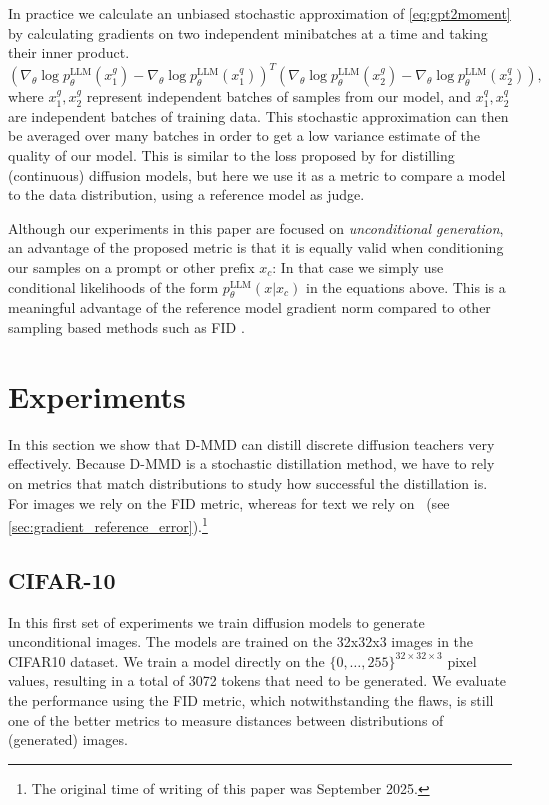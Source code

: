 In practice we calculate an unbiased stochastic approximation of \eqref{eq:gpt2moment} by calculating gradients on two independent minibatches at a time and taking their inner product.
\begin{equation}
(\nabla_{\theta} \log p_{\theta}^{\text{LLM}}(x^{g}_{1}) - \nabla_{\theta} \log p_{\theta}^{\text{LLM}}(x^{q}_{1}))^{T}(\nabla_{\theta} \log p_{\theta}^{\text{LLM}}(x^{g}_{2}) - \nabla_{\theta} \log p_{\theta}^{\text{LLM}}(x^{q}_{2})), \label{eq:batchgpt2moment}
\end{equation}
where $x^{g}_{1}, x^{g}_{2}$ represent independent batches of samples from our model, and $x^{q}_{1}, x^{q}_{2}$ are independent batches of training data. This stochastic approximation can then be averaged over many batches in order to get a low variance estimate of the quality of our model. This is similar to the loss proposed by \cite{salimans2024multistep} for distilling (continuous) diffusion models, but here we use it as a metric to compare a model to the data distribution, using a reference model as judge.

Although our experiments in this paper are focused on \emph{unconditional generation}, an advantage of the proposed metric is that it is equally valid when conditioning our samples on a prompt or other prefix $x_{c}$: In that case we simply use conditional likelihoods of the form $p_{\theta}^{\text{LLM}}(x|x_{c})$ in the equations above. This is a meaningful advantage of the reference model gradient norm compared to other sampling based methods such as FID \citep{heusel2017gans}.


\section{Experiments}
\label{sec:experiments}
In this section we show that D-MMD can distill discrete diffusion teachers very effectively. Because D-MMD is a stochastic distillation method, we have to rely on metrics that match distributions to study how successful the distillation is. For images we rely on the FID metric, whereas for text we rely on \gge~(see \autoref{sec:gradient_reference_error}).\footnote{The original time of writing of this paper was September 2025.}
\clearpage  %

\subsection{CIFAR-10}

In this first set of experiments we train diffusion models to generate unconditional images.
The models are trained on the 32x32x3 images in the CIFAR10 dataset.
We train a model directly on the $\{0, \ldots, 255\}^{32\times32\times3}$ pixel values, resulting in a total of 3072 tokens that need to be generated.
We evaluate the performance using the FID metric, which notwithstanding the flaws, is still one of the better metrics to measure distances between distributions of (generated) images.

